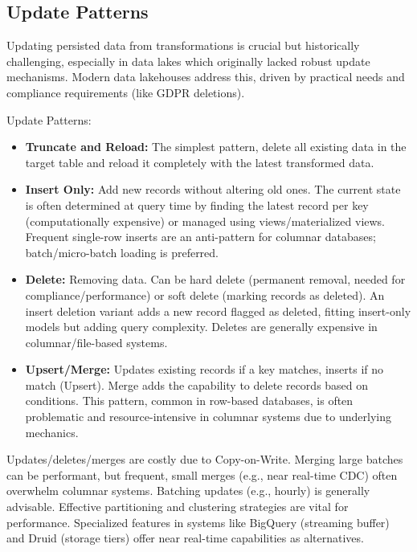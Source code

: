 \subsection*{Update Patterns}
Updating persisted data from transformations is crucial but
historically challenging, especially in data lakes which
originally lacked robust update mechanisms. Modern data
lakehouses address this, driven by practical needs and
compliance requirements (like GDPR deletions).

Update Patterns:
\begin{itemize}
    \item \textbf{Truncate and Reload:} The simplest
    pattern, delete all existing data in the target table
    and reload it completely with the latest transformed
    data.

    \item \textbf{Insert Only:} Add new records without
    altering old ones. The current state is often
    determined at query time by finding the latest record
    per key (computationally expensive) or managed using
    views/materialized views. Frequent single-row inserts
    are an anti-pattern for columnar databases;
    batch/micro-batch loading is preferred.

    \item \textbf{Delete:}  Removing data. Can be hard
    delete (permanent removal, needed for
    compliance/performance) or soft delete
    (marking records as deleted). An insert deletion
    variant adds a new record flagged as deleted,
    fitting insert-only models but adding query complexity.
    Deletes are generally expensive in columnar/file-based
    systems.

    \item \textbf{Upsert/Merge:} Updates existing records
    if a key matches, inserts if no match (Upsert).
    Merge adds the capability to delete records based on
    conditions. This pattern, common in row-based databases,
    is often problematic and resource-intensive in columnar
    systems due to underlying mechanics.
\end{itemize}

Updates/deletes/merges are costly due to Copy-on-Write.
Merging large batches can be performant, but frequent,
small merges (e.g., near real-time CDC) often overwhelm
columnar systems. Batching updates (e.g., hourly) is
generally advisable. Effective partitioning and
clustering strategies are vital for performance.
Specialized features in systems like BigQuery
(streaming buffer) and Druid (storage tiers)
offer near real-time capabilities as alternatives.



